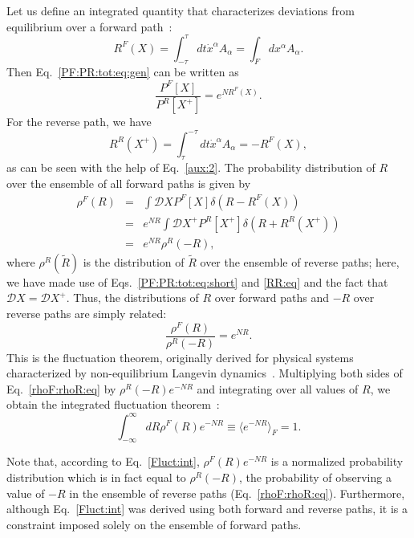 \documentclass[9pt,twocolumn,twoside]{gsajnl}
\begin{document}
Let us define an integrated quantity that characterizes deviations from equilibrium over a forward path~\citep{Chernyak2006}:
\begin{equation} \label{RF:eq}
R^F (X) = \int_{-\tau}^{\tau} dt \dot{x}^\alpha A_\alpha = \int_F d x^\alpha A_\alpha.
\end{equation}
Then Eq.~\eqref{PF:PR:tot:eq:gen} can be written as
\begin{equation} \label{PF:PR:tot:eq:short}
\frac{P^F [X]}{P^R [X^+]} = e^{N R^F (X)}.
\end{equation}
For the reverse path, we have
\begin{equation} \label{RR:eq}
R^R (X^+) = \int_{\tau}^{-\tau} dt \dot{x}^\alpha A_\alpha = -R^F (X),
\end{equation}
as can be seen with the help of Eq.~\eqref{aux:2}.
The probability distribution of $R$ over the ensemble of all forward paths is given by
\begin{eqnarray} \label{rhoF:eq}
\rho^F (R) &=& \int \mathcal{D} X P^F [X] \delta (R - R^F (X)) \\
&=& e^{NR} \int \mathcal{D} X^+ P^R [X^+] \delta (R + R^R (X^+)) \nonumber \\
&=& e^{NR} \rho^R (-R), \nonumber
\end{eqnarray}
where $\rho^R (\widetilde{R})$ is the distribution of $\widetilde{R}$ over the ensemble of reverse paths; here, we have made use of Eqs.~\eqref{PF:PR:tot:eq:short} and \eqref{RR:eq} and the fact that
$\mathcal{D} X = \mathcal{D} X^+$. Thus, the distributions of $R$ over forward paths and $-R$ over reverse paths %
are simply related:
\begin{equation} \label{rhoF:rhoR:eq}
\frac{\rho^F (R)}{\rho^R (-R)} = e^{NR}.
\end{equation}
This is the fluctuation theorem, originally derived for physical systems characterized by non-equilibrium Langevin dynamics~\citep{Crooks1999,Crooks2000,Seifert2005,Chernyak2006}.
Multiplying both sides of Eq.~\eqref{rhoF:rhoR:eq} by ${\rho^R (-R)} e^{-NR}$ and integrating over all values of $R$, we obtain the integrated fluctuation theorem~\citep{Jarzynski1997,Seifert2005,Chernyak2006,Pitaevskii2011}:
\begin{equation} \label{Fluct:int}
\int_{-\infty}^{\infty} dR \rho^F (R) e^{-NR} \equiv \langle e^{-NR} \rangle_F = 1.
\end{equation}

Note that, according to Eq.~\eqref{Fluct:int}, $\rho^F (R) e^{-NR}$ is a normalized probability distribution which is in fact equal to $\rho^R (-R)$, the probability of observing a value of $-R$ in the ensemble of reverse paths
(Eq.~\eqref{rhoF:rhoR:eq}). Furthermore, although Eq.~\eqref{Fluct:int} was derived using both forward and reverse paths, it is a constraint imposed solely on the ensemble of forward paths. 
\end{document}
